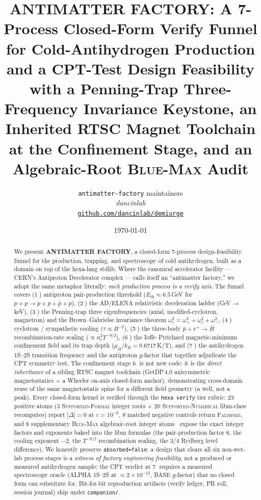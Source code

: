 \documentclass[11pt,a4paper]{article}
\title{
  \textbf{ANTIMATTER FACTORY: A 7-Process Closed-Form Verify Funnel
  for Cold-Antihydrogen Production and a CPT-Test Design Feasibility} \\[6pt]
  \large with a Penning-Trap Three-Frequency Invariance Keystone, an Inherited
  RTSC Magnet Toolchain at the Confinement Stage, and an Algebraic-Root
  \textsc{Blue-Max} Audit
}
\author{
  \texttt{antimatter-factory} maintainers\\
  \normalsize\textit{dancinlab}\\[2pt]
  \normalsize\href{https://github.com/dancinlab/demiurge}{\texttt{github.com/dancinlab/demiurge}}
}
\date{\today}
\begin{document}
\maketitle

\begin{abstract}
We present \textbf{ANTIMATTER FACTORY}, a closed-form 7-process
design-feasibility funnel for the production, trapping, and spectroscopy
of cold antihydrogen, built as a domain on top of the hexa-lang stdlib.
Where the canonical accelerator facility --- CERN's Antiproton Decelerator
complex --- calls itself an ``antimatter factory,'' we adopt the same
metaphor literally: \emph{each production process is a verify axis}. The
funnel covers (\textcircled{\scriptsize 1}) antiproton pair-production
threshold ($E_{\mathrm{th}}\!\approx\!6.5$\,GeV for $p+p\!\to\!p+p+\bar p+p$),
(\textcircled{\scriptsize 2}) the AD/ELENA relativistic deceleration ladder
(GeV$\to$keV), (\textcircled{\scriptsize 3}) the Penning-trap three
eigenfrequencies (axial, modified-cyclotron, magnetron) and the
Brown--Gabrielse invariance theorem
$\omega_c^2=\omega_+^2+\omega_z^2+\omega_-^2$,
(\textcircled{\scriptsize 4}) cyclotron / sympathetic cooling
($\tau\!\propto\!B^{-2}$), (\textcircled{\scriptsize 5}) the three-body
$\bar p + e^+ \!\to\! \bar H$ recombination-rate scaling
($\propto n_e^2 T^{-9/2}$), (\textcircled{\scriptsize 6}) the
Ioffe--Pritchard magnetic-minimum confinement field and its trap depth
($\mu_B/k_B = 0.6717$\,K/T), and (\textcircled{\scriptsize 7}) the
antihydrogen 1S--2S transition frequency and the antiproton $g$-factor that
together adjudicate the CPT symmetry test. The confinement stage
\textcircled{\scriptsize 6} is not new code: it is the \emph{direct
inheritance} of a sibling RTSC magnet toolchain (GetDP\,4.0 axisymmetric
magnetostatics + a Wheeler on-axis closed-form anchor), demonstrating
cross-domain reuse of the same magnetostatic spine for a different field
geometry (a well, not a peak). Every closed-form kernel is verified through
the \texttt{hexa verify} tier rubric: 23 positive atoms (3
\textsc{Supported-Formal} integer roots + 20 \textsc{Supported-Numerical}
libm-class recomputes) report $|\Delta|=0$ at $\varepsilon=10^{-9}$, 8
matched negative controls return \textsc{Falsified}, and 8 supplementary
\textsc{Blue-Max} algebraic-root integer atoms~\citep{anthropic2026hexag69}
expose the exact integer factors and exponents baked into the libm formulas
(the pair-production factor $6$, the cooling exponent $-2$, the $T^{-9/2}$
recombination scaling, the $3/4$ Rydberg level difference). We honestly
preserve \texttt{absorbed=false}: a design that clears all six non-wet-lab
process stages is a \emph{witness of factory engineering feasibility}, not a
produced or measured antihydrogen sample; the CPT verdict at
\textcircled{\scriptsize 7} requires a measured spectroscopy oracle (ALPHA
1S--2S at $\approx\!2\!\times\!10^{-12}$, BASE $g$-factor) that no closed
form can substitute for. Bit-for-bit reproduction artifacts (verify ledger,
PR roll, session journal) ship under \texttt{companion/}.
\end{abstract}
\end{document}
